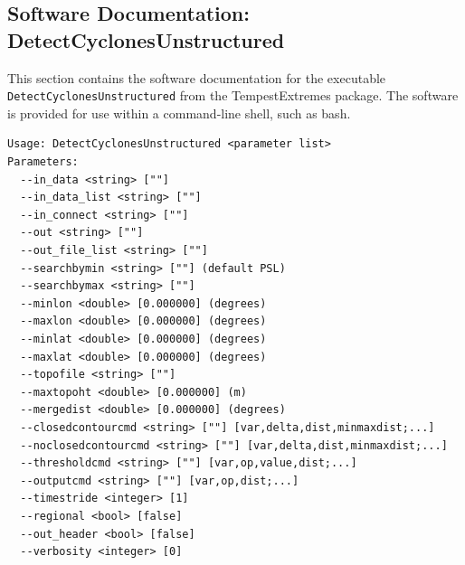 \documentclass[gmdd, hvmath, online]{copernicus_discussions}
\begin{document}


\subsection{Software Documentation: DetectCyclonesUnstructured} \label{sec:DetectCyclonesUnstructuredAppendix}

This section contains the software documentation for the executable \texttt{DetectCyclonesUnstructured} from the TempestExtremes package.  The software is provided for use within a command-line shell, such as bash.

{\small
\begin{verbatim}
Usage: DetectCyclonesUnstructured <parameter list>
Parameters:
  --in_data <string> [""] 
  --in_data_list <string> [""]
  --in_connect <string> [""] 
  --out <string> [""] 
  --out_file_list <string> [""]
  --searchbymin <string> [""] (default PSL)
  --searchbymax <string> [""] 
  --minlon <double> [0.000000] (degrees)
  --maxlon <double> [0.000000] (degrees)
  --minlat <double> [0.000000] (degrees)
  --maxlat <double> [0.000000] (degrees)
  --topofile <string> [""] 
  --maxtopoht <double> [0.000000] (m)
  --mergedist <double> [0.000000] (degrees)
  --closedcontourcmd <string> [""] [var,delta,dist,minmaxdist;...]
  --noclosedcontourcmd <string> [""] [var,delta,dist,minmaxdist;...]
  --thresholdcmd <string> [""] [var,op,value,dist;...]
  --outputcmd <string> [""] [var,op,dist;...]
  --timestride <integer> [1] 
  --regional <bool> [false] 
  --out_header <bool> [false] 
  --verbosity <integer> [0] 
\end{verbatim}
}
\end{document}
